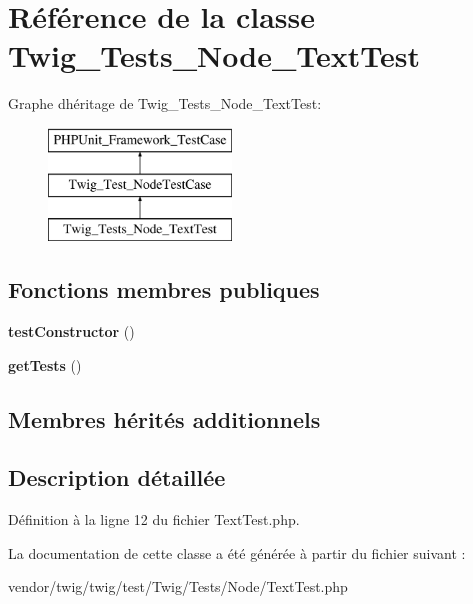 \hypertarget{class_twig___tests___node___text_test}{}\section{Référence de la classe Twig\+\_\+\+Tests\+\_\+\+Node\+\_\+\+Text\+Test}
\label{class_twig___tests___node___text_test}
Graphe d\textquotesingle{}héritage de Twig\+\_\+\+Tests\+\_\+\+Node\+\_\+\+Text\+Test\+:\begin{figure}[H]
\begin{center}
\leavevmode
\includegraphics[height=3.000000cm]{class_twig___tests___node___text_test}
\end{center}
\end{figure}
\subsection*{Fonctions membres publiques}
\begin{DoxyCompactItemize}
\item 
{\bfseries test\+Constructor} ()\hypertarget{class_twig___tests___node___text_test_a47094dc941e72950570900d1418f89c6}{}\label{class_twig___tests___node___text_test_a47094dc941e72950570900d1418f89c6}

\item 
{\bfseries get\+Tests} ()\hypertarget{class_twig___tests___node___text_test_a7e247dd31cc8d37a6c97353a062a0080}{}\label{class_twig___tests___node___text_test_a7e247dd31cc8d37a6c97353a062a0080}

\end{DoxyCompactItemize}
\subsection*{Membres hérités additionnels}


\subsection{Description détaillée}


Définition à la ligne 12 du fichier Text\+Test.\+php.



La documentation de cette classe a été générée à partir du fichier suivant \+:\begin{DoxyCompactItemize}
\item 
vendor/twig/twig/test/\+Twig/\+Tests/\+Node/Text\+Test.\+php\end{DoxyCompactItemize}
